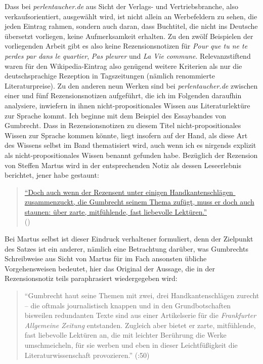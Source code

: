 \documentclass[fontsize=12pt]{scrartcl}
\begin{document}
Dass bei \textit{per\-len\-tau\-cher.de} aus Sicht der Verlags- und Vertriebsbranche, also ver\-kaufs\-ori\-en\-tiert, ausgew\"ahlt wird, ist nicht allein an Werbefeldern zu sehen, die jeden Eintrag rahmen, sondern auch daran, dass Buchtitel, die nicht ins Deutsche \"ubersetzt vorliegen, keine Aufmerksamkeit erhalten. Zu den zw\"olf Beispielen der vorliegenden Arbeit gibt es also keine Rezensionsnotizen f\"ur \textit{Pour que tu ne te perdes par dans le quartier}, \textit{Pas pleurer} und \textit{La Vie commune}. Relevanzstiftend waren f\"ur den Wi\-ki\-pe\-dia-Eintrag also gen\"ugend weitere Kriterien als nur die deutschspra\-chi\-ge Rezeption in Tagszeitungen (n\"amlich renommierte Li\-te\-ra\-tur\-preise). Zu den anderen neun Werken sind bei \textit{per\-len\-tau\-cher.de} zwischen einer und f\"unf Rezensionsnotizen aufgef\"uhrt, die ich im Folgenden daraufhin ana\-lysiere, inwiefern in ihnen nicht-pro\-po\-si\-ti\-o\-na\-les Wissen aus Li\-te\-ra\-tur\-lekt\"ure zur Sprache kommt.
Ich beginne mit dem Beispiel des Essaybandes von Gumbrecht. Dass in Rezensionsnotizen zu diesem Titel nicht-pro\-po\-si\-ti\-o\-na\-les Wissen zur Sprache kommen k\"onnte, liegt insofern auf der Hand, als diese Art des Wissens \mbox{selbst} im Band thematisiert wird, auch wenn ich es nirgends explizit als nicht-pro\-po\-si\-ti\-o\-na\-les Wissen benannt gefunden habe. Bez\"uglich der Rezension von Steffen Martus wird in der entsprechenden Notiz als dessen Leseerlebnis berichtet, jener habe gestaunt: 

\singlespacing 
\begin{quote}
\href{http://www.perlentaucher.de/buch/hans-ulrich-gumbrecht/stimmungen-lesen.html}{"`Doch auch wenn der Rezensent unter einigen \flq Handkantenschl\"agen\frq \,\,zusammenzuckt, die Gumbrecht seinem Thema zuf\"ugt, muss er doch auch staunen: \flq \"uber zar\-te, mit\-f\"uh\-len\-de, fast liebevolle Lekt\"uren\frq."'}\\ (\cite{Anonym*ohneDatum1})
\end{quote}
\onehalfspacing

Bei Martus \mbox{selbst} ist dieser Eindruck verhaltener formuliert, denn der Zielpunkt des Satzes ist ein an\-de\-rer, n\"amlich eine Betrachtung dar\"uber, was Gumbrechts Schreibweise aus Sicht von Martus f\"ur im Fach ansonsten \"ubliche Vorgehensweisen bedeutet, \mbox{hier} das Original der Aussage, die in der Rezensionsnotiz teils paraphrasiert wiedergegeben wird: 

\singlespacing 
\begin{quote}
"`Gumbrecht haut seine Themen mit zwei, drei Handkantenschl\"agen zu\-recht -- die oftmals journalistisch knappen und in den Grundbotschaften bis\-wei\-len redundanten Texte sind aus einer Artikelserie f\"ur die \textit{Frankfurter Allgemeine Zeitung} entstanden. Zugleich aber bietet er zar\-te, mit\-f\"uh\-len\-de, fast liebevolle Lekt\"uren an, die mit leichter Ber\"uh\-rung die Werke umschmeicheln, f\"ur sie werben und eben in dieser Leichtf\"u{\ss}igkeit die Li\-te\-ra\-tur\-wissenschaft provozieren."' (\cite{Martus2011}:50)
\end{quote}
\onehalfspacing
\end{document}

